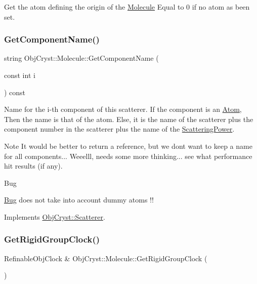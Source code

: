 Get the atom defining the origin of the \mbox{\hyperlink{class_obj_cryst_1_1_molecule}{Molecule}} Equal to 0 if no atom as been set. \mbox{\label{class_obj_cryst_1_1_molecule_aa72f797c744577e606fa6976d8c7dcf8}} 
\subsubsection{\texorpdfstring{GetComponentName()}{GetComponentName()}}
{\footnotesize\ttfamily string Obj\+Cryst\+::\+Molecule\+::\+Get\+Component\+Name (\begin{DoxyParamCaption}\item[{const int}]{i }\end{DoxyParamCaption}) const\hspace{0.3cm}{\ttfamily [virtual]}}

Name for the i-\/th component of this scatterer. If the component is an \mbox{\hyperlink{class_obj_cryst_1_1_atom}{Atom}}, Then the name is that of the atom. Else, it is the name of the scatterer plus the component number in the scatterer plus the name of the \mbox{\hyperlink{class_obj_cryst_1_1_scattering_power}{Scattering\+Power}}. \begin{DoxyNote}{Note}
It would be better to return a reference, but we don\textquotesingle{}t want to keep a name for all components... Weeelll, needs some more thinking... see what performance hit results (if any).
\end{DoxyNote}
\begin{DoxyRefDesc}{Bug}
\item[\mbox{\hyperlink{bug__bug000001}{Bug}}]does not take into account dummy atoms !! \end{DoxyRefDesc}


Implements \mbox{\hyperlink{class_obj_cryst_1_1_scatterer_a42bdf508da6a90859a5a61e16c27d47e}{Obj\+Cryst\+::\+Scatterer}}.

\mbox{\label{class_obj_cryst_1_1_molecule_a6f7aea0410adabd5e0159d082feefe72}} 
\subsubsection{\texorpdfstring{GetRigidGroupClock()}{GetRigidGroupClock()}\hspace{0.1cm}{\footnotesize\ttfamily [1/2]}}
{\footnotesize\ttfamily Refinable\+Obj\+Clock \& Obj\+Cryst\+::\+Molecule\+::\+Get\+Rigid\+Group\+Clock (\begin{DoxyParamCaption}{ }\end{DoxyParamCaption})}

